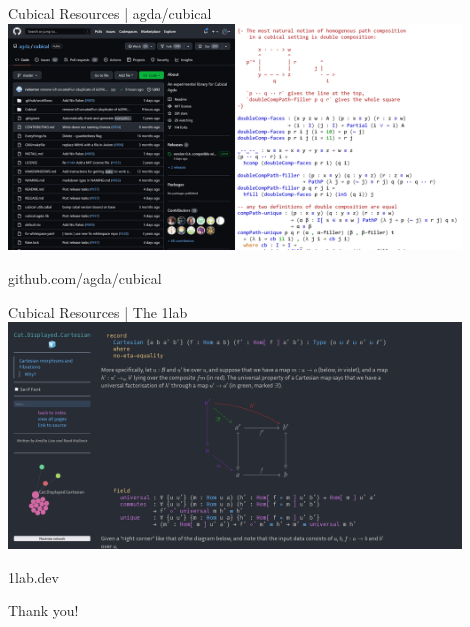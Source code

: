 \begin{frame}[plain,t]{Cubical Resources | agda/cubical}
	\centering
	\includegraphics[width=0.9\textwidth]{../res/agda-cubical.png}

	github.com/agda/cubical

\end{frame}

\begin{frame}[plain,t]{Cubical Resources | The 1lab}
	\centering
	\includegraphics[width=0.9\textwidth]{../res/1lab-cartesian.png}

	1lab.dev
\end{frame}

\begin{frame}[plain]
	\centering
	Thank you!
\end{frame}
